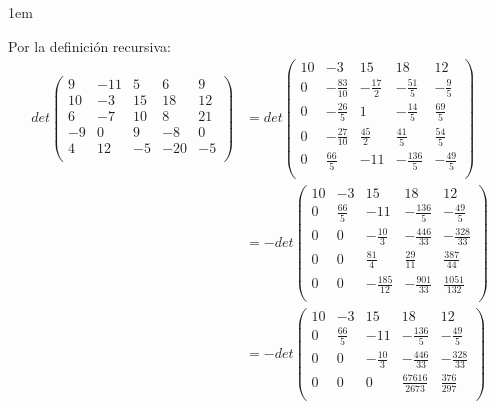 \documentclass[12pt, fleqn]{article}                             %
\newenvironment{SmallIndentation}[1][0.75em]                    %
        {\begin{adjustwidth}{#1}{}\begin{footnotesize}}             %
        {\end{footnotesize}\end{adjustwidth}}                       %
\theoremstyle{break}                                            %
\newcommand{\pVector}[1]                                        %
        { \ensuremath{\begin{pmatrix}#1\end{pmatrix}} }             %
\begin{document}
\begin{itemize}
\begin{SmallIndentation}[1em]
                Por la definición recursiva:
                \begin{align*}
                    det \pVector{
                        9  & -11 & 5  & 6   & 9    \\ 
                        10 & -3  & 15 & 18  & 12   \\ 
                        6  & -7  & 10 & 8   & 21   \\ 
                        -9 & 0   & 9  & -8  & 0    \\ 
                        4  & 12  & -5 & -20 & -5   \\ 
                        }
                    &=
                    det \pVector{
                        10  & -3 & 15  & 18   & 12    \\ 
                        0   & -\frac{83}{10}  & -\frac{17}{2} & -\frac{51}{5} & -\frac{9}{5} \\
                        0   & -\frac{26}{5}  & 1 & -\frac{14}{5} & \frac{69}{5} \\
                        0   & -\frac{27}{10}  & \frac{45}{2} & \frac{41}{5} & \frac{54}{5} \\
                        0   & \frac{66}{5}  & -11 & -\frac{136}{5} & -\frac{49}{5} \\
                        }\\
                    &=
                    -det \pVector{
                        10  & -3 & 15  & 18   & 12    \\ 
                        0   & \frac{66}{5}  & -11 & -\frac{136}{5} & -\frac{49}{5} \\
                        0   & 0  & -\frac{10}{3} & -\frac{446}{33} & -\frac{328}{33} \\
                        0   & 0  & \frac{81}{4} & \frac{29}{11} & \frac{387}{44} \\
                        0   & 0  & -\frac{185}{12} & -\frac{901}{33} & \frac{1051}{132} \\
                        }\\
                    &=
                    -det \pVector{
                        10  & -3 & 15  & 18   & 12    \\ 
                        0   & \frac{66}{5}  & -11 & -\frac{136}{5} & -\frac{49}{5} \\
                        0   & 0  & -\frac{10}{3} & -\frac{446}{33} & -\frac{328}{33} \\
                        0   & 0  & 0 & \frac{67616}{2673} & \frac{376}{297} \\
}
\end{align*}
\end{SmallIndentation}
\end{itemize}
\end{document}
